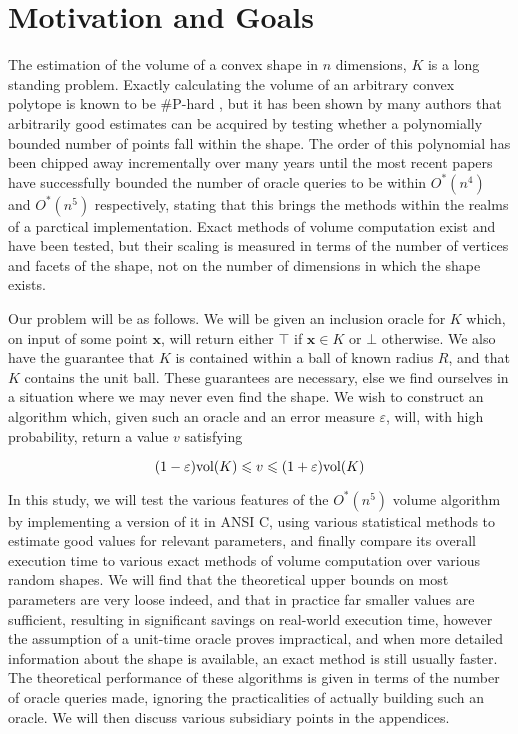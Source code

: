 \section{Motivation and Goals}

The estimation of the volume of a convex shape in $n$ dimensions, $K$ is a long standing problem. Exactly calculating the volume of an arbitrary convex polytope is known to be \#P-hard \cite{Dyer88}, but it has been shown by many authors \cite{Dyer95, Kannan97, Lovasz03}
that arbitrarily good estimates can be acquired by testing whether a polynomially bounded number of points fall within the shape. The order of this polynomial has been chipped away incrementally over many years until the most recent papers have successfully bounded the number of oracle queries to be within $O^{*}(n^4)$ and $O^{*}(n^5)$ respectively, stating that this brings the methods within the realms of a parctical implementation. Exact methods of volume computation exist and have been tested, but their scaling is measured in terms of the number of vertices and facets of the shape, not on the number of dimensions in which the shape exists. 

Our problem will be as follows. We will be given an inclusion oracle for $K$ which, on input of some point $\bm{x}$, will return either $\top$ if $\bm{x} \in K$ or $\bot$ otherwise. We also have the guarantee that $K$ is contained within a ball of known radius $R$, and that $K$ contains the unit ball. These guarantees are necessary, else we find ourselves in a situation where we may never even find the shape. We wish to construct an algorithm which, given such an oracle and an error measure $\varepsilon$, will, with high probability, return a value $v$ satisfying

$$
(1-\varepsilon)\mbox{vol}(K) \leqslant v \leqslant (1+\varepsilon)\mbox{vol}(K)
$$

In this study, we will test the various features of the $O^{*}(n^5)$ volume algorithm by implementing a version of it in ANSI C, using various statistical methods to estimate good values for relevant parameters, and finally compare its overall execution time to various exact methods of volume computation over various random shapes. We will find that the theoretical upper bounds on most parameters are very loose indeed, and that in practice far smaller values are sufficient, resulting in significant savings on real-world execution time, however the assumption of a unit-time oracle proves impractical, and when more detailed information about the shape is available, an exact method is still usually faster. The theoretical performance of these algorithms is given in terms of the number of oracle queries made, ignoring the practicalities of actually building such an oracle. We will then discuss various subsidiary points in the appendices.

